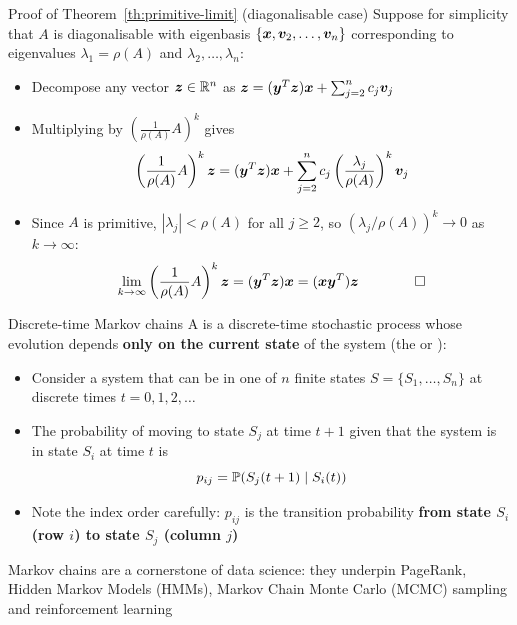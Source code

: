 \documentclass[aspectratio=169]{beamer}\usepackage[]{graphicx}\usepackage[]{xcolor}
\begin{document}
\begin{frame}{Proof of Theorem~\ref{th:primitive-limit} (diagonalisable case)}
Suppose for simplicity that $A$ is diagonalisable with eigenbasis $\{\bm{x}, \bm{v}_2, \ldots, \bm{v}_n\}$ corresponding to eigenvalues $\lambda_1 = \rho(A)$ and $\lambda_2, \ldots, \lambda_n$:
\vfill
\begin{itemize}
\item Decompose any vector $\bm{z} \in \mathbb{R}^n$ as $\bm{z} = (\bm{y}^T\bm{z})\bm{x} + \sum_{j=2}^n c_j \bm{v}_j$
\item Multiplying by $\left(\frac{1}{\rho(A)} A\right)^k$ gives
\[
\left(\frac{1}{\rho(A)} A\right)^k \bm{z} = (\bm{y}^T\bm{z})\bm{x} + \sum_{j=2}^n c_j \left(\frac{\lambda_j}{\rho(A)}\right)^k \bm{v}_j
\]
\item Since $A$ is primitive, $|\lambda_j| < \rho(A)$ for all $j \ge 2$, so $(\lambda_j / \rho(A))^k \to 0$ as $k \to \infty$:
\[
\lim_{k \to \infty} \left(\frac{1}{\rho(A)} A\right)^k \bm{z} = (\bm{y}^T\bm{z})\bm{x} = (\bm{x} \bm{y}^T)\bm{z} \qquad \qed
\]
\end{itemize}
\end{frame}




\begin{frame}{Discrete-time Markov chains}
A  is a discrete-time stochastic process whose evolution depends \textbf{only on the current state} of the system (the  or ):
\begin{itemize}
\item Consider a system that can be in one of $n$ finite states $S = \{S_1, \ldots, S_n\}$ at discrete times $t = 0, 1, 2, \ldots$
\item The probability of moving to state $S_j$ at time $t+1$ given that the system is in state $S_i$ at time $t$ is
\[
p_{ij} = \mathbb{P}(S_j(t+1) \mid S_i(t))
\]
\item Note the index order carefully: $p_{ij}$ is the transition probability \textbf{from state $S_i$ (row $i$) to state $S_j$ (column $j$)}
\end{itemize}
\vfill
Markov chains are a cornerstone of data science: they underpin PageRank, Hidden Markov Models (HMMs), Markov Chain Monte Carlo (MCMC) sampling and reinforcement learning
\end{frame}
\end{document}
